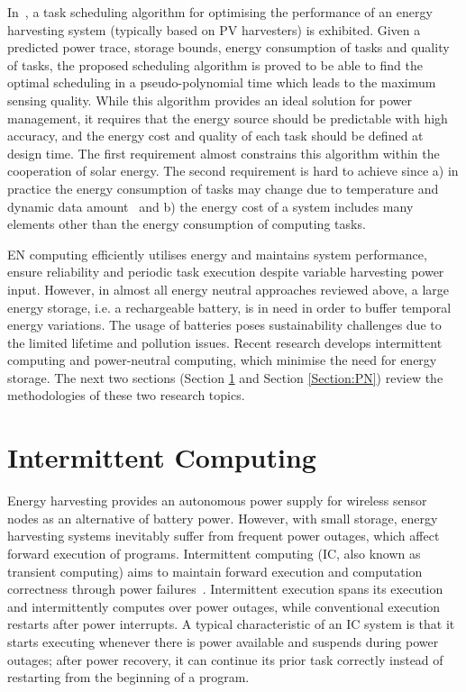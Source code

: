 In~\cite{caruso2018dynamic}, a task scheduling algorithm for optimising the performance of an energy harvesting system (typically based on PV harvesters) is exhibited. Given a predicted power trace, storage bounds, energy consumption of tasks and quality of tasks, the proposed scheduling algorithm is proved to be able to find the optimal scheduling in a pseudo-polynomial time which leads to the maximum sensing quality. While this algorithm provides an ideal solution for power management, it requires that the energy source should be predictable with high accuracy, and the energy cost and quality of each task should be defined at design time. The first requirement almost constrains this algorithm within the cooperation of solar energy. The second requirement is hard to achieve since a) in practice the energy consumption of tasks may change due to temperature and dynamic data amount~\cite{walker2016thermally} and b) the energy cost of a system includes many elements other than the energy consumption of computing tasks.

EN computing efficiently utilises energy and maintains system performance, ensure reliability and periodic task execution despite variable harvesting power input. However, in almost all energy neutral approaches reviewed above, a large energy storage, i.e. a rechargeable battery, is in need in order to buffer temporal energy variations. The usage of batteries poses sustainability challenges due to the limited lifetime and pollution issues. Recent research develops intermittent computing and power-neutral computing, which minimise the need for energy storage. The next two sections (Section \ref{Section:IC} and Section \ref{Section:PN}) review the methodologies of these two research topics. 

\section{Intermittent Computing} \label{Section:IC}

Energy harvesting provides an autonomous power supply for wireless sensor nodes as an alternative of battery power. However, with small storage, energy harvesting systems inevitably suffer from frequent power outages, which affect forward execution of programs. Intermittent computing (IC, also known as transient computing) aims to maintain forward execution and computation correctness through power failures~\cite{ransford2012mementos}. Intermittent execution spans its execution and intermittently computes over power outages, while conventional execution restarts after power interrupts. A typical characteristic of an IC system is that it starts executing whenever there is power available and suspends during power outages; after power recovery, it can continue its prior task correctly instead of restarting from the beginning of a program. 


